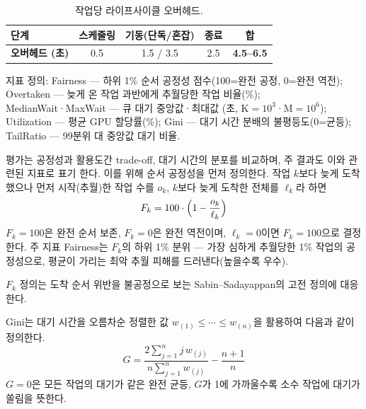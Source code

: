 \documentclass{ieeetj}
\begin{document}
\begin{table}[htb!]
\centering
\caption{작업당 라이프사이클 오버헤드.}
\label{tab:overhead}
\small
\begin{tabular}{@{}lcccc@{}}
\toprule
\textbf{단계} & 스케줄링 & 기동(단독/혼잡) & 종료 & \textbf{합} \\
\midrule
\textbf{오버헤드 (초)} & 0.5 & 1.5 / 3.5 & 2.5 & \textbf{4.5--6.5} \\
\bottomrule
\end{tabular}
\end{table} 

\noindent 지표 정의: Fairness --- 하위 1\% 순서 공정성 점수(100=완전 공정, 0=완전 역전); Overtaken --- 늦게 온 작업 과반에게 추월당한 작업 비율(\%); MedianWait·MaxWait --- 큐 대기 중앙값·최대값 (초, K$=10^3$·M$=10^6$); Utilization --- 평균 GPU 할당률(\%); Gini --- 대기 시간 분배의 불평등도(0=균등); TailRatio --- 99분위 대 중앙값 대기 비율.

평가는 공정성과 활용도간 trade-off, 대기 시간의 분포를 비교하며, 주 결과도 이와 관련된 지표로 표기 한다. 이를 위해 순서 공정성을 먼저 정의한다. 작업 $k$보다 늦게 도착했으나 먼저 시작(추월)한 작업 수를 $o_k$, $k$보다 늦게 도착한 전체를 $\ell_k$라 하면
\begin{equation}
F_k = 100\cdot\Bigl(1 - \frac{o_k}{\ell_k}\Bigr)
\label{eq:order-fair}
\end{equation}
$F_k=100$은 완전 순서 보존, $F_k=0$은 완전 역전이며, $\ell_k=0$이면 $F_k=100$으로 결정한다. 주 지표 Fairness는 $F_k$의 하위 1\% 분위 --- 가장 심하게 추월당한 1\% 작업의 공정성으로, 평균이 가리는 최악 추월 피해를 드러낸다(높을수록 우수).

$F_k$ 정의는 도착 순서 위반을 불공정으로 보는 Sabin--Sadayappan\cite{sabin2005unfairness}의 고전 정의에 대응한다. 

Gini는 대기 시간을 오름차순 정렬한 값 $w_{(1)}\le\cdots\le w_{(n)}$을 활용하여 다음과 같이 정의한다. 
\begin{equation}
G = \frac{2\sum_{j=1}^{n} j\,w_{(j)}}{n\sum_{j=1}^{n} w_{(j)}} - \frac{n+1}{n}
\label{eq:gini}
\end{equation}
$G=0$은 모든 작업의 대기가 같은 완전 균등, $G$가 1에 가까울수록 소수 작업에 대기가 쏠림을 뜻한다. 
\end{document}
